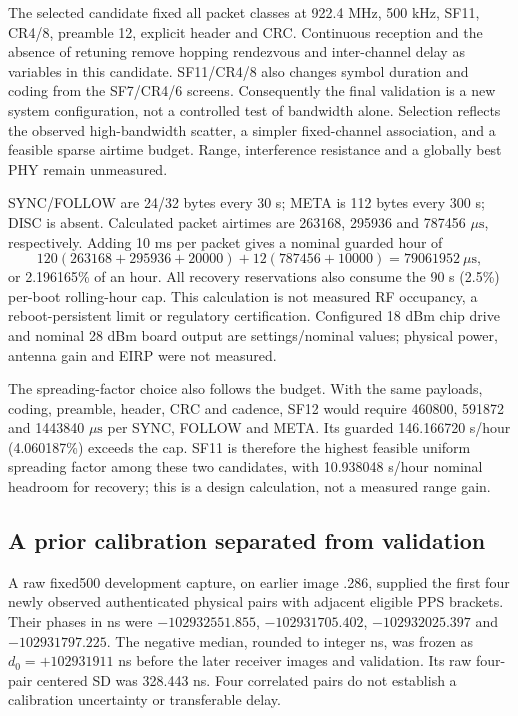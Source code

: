 \documentclass[10pt,letterpaper]{article}
\newcommand{\us}{\ensuremath{\mu\mathrm{s}}}
\begin{document}
The selected candidate fixed all packet classes at 922.4 MHz, 500 kHz, SF11,
CR4/8, preamble 12, explicit header and CRC. Continuous reception and the
absence of retuning remove hopping rendezvous and inter-channel delay as
variables in this candidate. SF11/CR4/8 also changes symbol duration and coding
from the SF7/CR4/6 screens. Consequently the final validation is a new system
configuration, not a controlled test of bandwidth alone. Selection reflects
the observed high-bandwidth scatter, a simpler fixed-channel association, and
a feasible sparse airtime budget. Range, interference resistance and a globally
best PHY remain unmeasured.

SYNC/FOLLOW are 24/32 bytes every 30 s; META is 112 bytes every 300 s; DISC is
absent. Calculated packet airtimes are 263168, 295936 and 787456 \us{},
respectively. Adding 10 ms per packet gives a nominal guarded hour of
\[
120(263168+295936+20000)+12(787456+10000)
=79061952\ \us{},
\]
or 2.196165\% of an hour. All recovery reservations also consume the 90 s
(2.5\%) per-boot rolling-hour cap. This calculation is not measured RF
occupancy, a reboot-persistent limit or regulatory certification. Configured
18 dBm chip drive and nominal 28 dBm board output are settings/nominal values;
physical power, antenna gain and EIRP were not measured.

The spreading-factor choice also follows the budget. With the same payloads,
coding, preamble, header, CRC and cadence, SF12 would require 460800, 591872
and 1443840 \us{} per SYNC, FOLLOW and META. Its guarded 146.166720 s/hour
(4.060187\%) exceeds the cap. SF11 is therefore the highest feasible uniform
spreading factor among these two candidates, with 10.938048 s/hour nominal
headroom for recovery; this is a design calculation, not a measured range gain.

\subsection{A prior calibration separated from validation}
A raw fixed500 development capture, on earlier image .286, supplied the first
four newly observed authenticated physical pairs with adjacent eligible PPS
brackets. Their phases in ns were $-102932551.855$, $-102931705.402$,
$-102932025.397$ and $-102931797.225$. The negative median, rounded to integer
ns, was frozen as $d_0=+102931911$ ns before the later receiver images and
validation. Its raw four-pair centered SD was 328.443 ns. Four correlated
pairs do not establish a calibration uncertainty or transferable delay.
\end{document}

